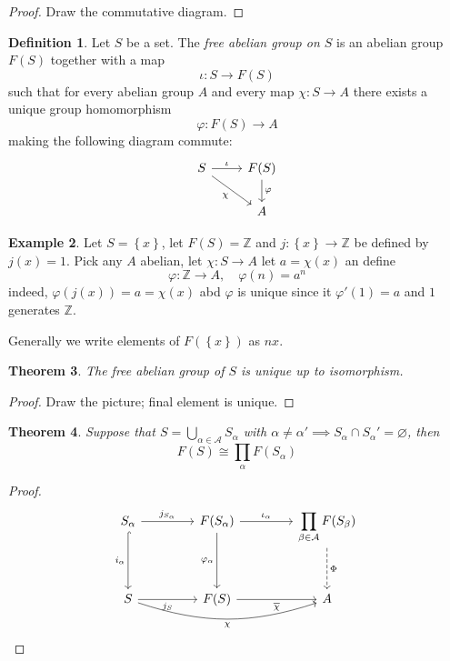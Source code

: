 \documentclass[11pt,a4paper]{article}
\theoremstyle{definition}
\newtheorem{definition}{Definition}[section]
\newtheorem{example}[definition]{Example}
\theoremstyle{plain}
\newtheorem{theorem}[definition]{Theorem}
\theoremstyle{remark}
\newcommand{\Z}{\mathbb{Z}}
\renewcommand{\set}[1]{\left\{ #1 \right\}}
\newcommand{\1}{\mathbbm{1}}
\begin{document}
\begin{proof}
    Draw the commutative diagram. 
\end{proof}

\begin{definition}
Let $S$ be a set. The \emph{free abelian group on $S$} is an abelian group $F(S)$ together with a map
\[
\iota \colon S \to F(S)
\]
such that for every abelian group $A$ and every map $\chi \colon S \to A$ there exists a unique group homomorphism
\[
\varphi \colon F(S) \to A
\]
making the following diagram commute:
\[
\begin{tikzcd}
S \arrow[r, "\iota"] \arrow[dr, "\chi"'] & F(S) \arrow[d, "\varphi"] \\
& A
\end{tikzcd}
\]
\end{definition}


\begin{example}
    Let $S = \set{x}$, let $F(S) = \Z$ and $j \colon \set{x} \to \Z$ be defined by $j(x) = 1$. Pick any $A$ abelian, let $\chi \colon S \to A$ let 
    $a = \chi(x)$ an define 
    $$\varphi \colon \Z \to A, \quad \varphi(n) = a^n$$
    indeed, $\varphi(j(x)) = a = \chi (x)$ abd $\varphi$ is unique since it $\varphi'(1) = a$ and $1$ generates $\Z$. 

    Generally we write elements of $F(\set{x})$ as $nx$. 
\end{example}

\begin{theorem}
    The free abelian group of $S$ is unique up to isomorphism. 
\end{theorem}

\begin{proof}
    Draw the picture; final element is unique.
\end{proof}

\begin{theorem}
    Suppose that $S = \bigcup_{\alpha \in \mathcal{A}} S_\alpha$ with $\alpha \ne \alpha' \implies S_\alpha \cap S_\alpha' = \varnothing$, then 
    $$F(S) \cong \prod_\alpha F(S_\alpha)$$
\end{theorem}

\begin{proof}
\[
\begin{tikzcd}[row sep=3.2em, column sep=4.2em]
S_\alpha
  \arrow[r,"j_{S_\alpha}"]
  \arrow[d,hookrightarrow,"i_\alpha"']
&
F(S_\alpha)
  \arrow[r,"\iota_\alpha"]
  \arrow[d,"\varphi_\alpha"']
&
\displaystyle \prod_{\beta\in\mathcal A} F(S_\beta)
  \arrow[d,dashed,"\Phi"]
\\
S
  \arrow[r,"j_S"']
  \arrow[rr,bend right=18,"\chi"']
&
F(S)
  \arrow[r,"\overline{\chi}"']
&
A
\end{tikzcd}
\]
\end{proof}
\end{document}

